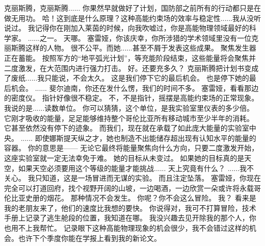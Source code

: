 \documentclass[openany]{book}
\begin{document}
\begin{dialogue}
     克丽斯腾，克丽斯腾......
     你果然早就做好了计划，国防部之前所有的行动都只是在做无用功。
     哈！这到底是什么原理？这种高能约束场的效率与稳定性......我从没听说过。
     我记得你在刚加入莱茵的时候，向我吹嘘过，你是高能物理领域最好的科学家。
     ......之一。
     天哪。
     塞雷娅，你该庆幸，你所涉猎的学术领域里没有一位克丽斯腾这样的人物。
     很不公平。而她......甚至不屑于发表这些成果。
     聚焦发生器正在蓄能。
     按照军方的“地平弧光计划”，等充能阶段结束，这些能量将会聚焦并二度激发，在大范围内进行强力打击。
     好。还要充多久？
     克丽斯腾把计划书变成了废纸......我只能说，不会太久。
     这是我们停下它的最后机会。
     也是停下她的最后机会。
     ......
     斐尔迪南，你还在发什么愣，我们的时间不多。
     塞雷娅，看看那边的密度仪。
     指针好像很不稳定。
     不，不是指针，摇摆是高能约束场的正常现象。我说的是......读数单位。
     你可以猜猜，这个单位，是我实验室里仪表的多少倍。
     它刚才吸收的能量，足足能够维持整个哥伦比亚所有移动城市至少半年的消耗。
     它甚至依然没有停下的迹象。
     而我们，现在就在承载了如此庞大能量的实验室中央。
     ......
     即使娜斯提天纵之才，她也制造不出能储存超出现有认知水平的能量的容器。
     你的意思是——
     无论它最终将能量聚焦向什么方向，只要二度激发开始，这座实验室就一定无法幸免于难。
     她的目标从未变过。
     如果她的目标真的是天空，如果天空必须要用这个等级的能量才能挑战......
     天上究竟有什么？
     ......我不关心。
     我只知道，这是一场冒进而无谋的实验。
     而且注定坠落。
     塞雷娅，你现在完全可以打道回府，找个视野开阔的山坡，一边喝酒，一边欣赏一朵或许将永载哥伦比亚史册的烟花。
     那种情况不会发生。
     你呢？你不会这么冒险。
     我？
     看来是我的老朋友来了，他们的速度比我想的要快。
     你说得对，我可不打算冒险，技术手册上记录了逃生舱段的位置，我知道在哪。
     我没兴趣去见开除我的那个人，你也用不上我帮忙。
     记录眼下这种高能物理现象的机会很少，我不会错过这样的机会。也许下个季度你能在学报上看到我的新论文。

\end{dialogue}
\end{document}
